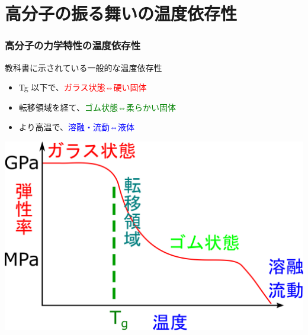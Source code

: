 \documentclass[12pt, dvipdfmx]{beamer}
\begin{document}
\section{高分子の振る舞いの温度依存性}
\begin{frame}
	\frametitle{高分子の力学特性の温度依存性}
			\begin{block}{教科書に示されている一般的な温度依存性}
				\begin{itemize}
					\item Tg 以下で、\textcolor{red}{ガラス状態⇔硬い固体}
					\item 転移領域を経て、\textcolor{green}{ゴム状態⇔柔らかい固体}
					\item より高温で、\textcolor{blue}{溶融・流動⇔液体}
				\end{itemize}
			\end{block}
				\vspace{3mm}
				\begin{center}
					\includegraphics[width=.6\textwidth]{polymer_spectrum.png}
				\end{center}
\end{frame}
\end{document}
